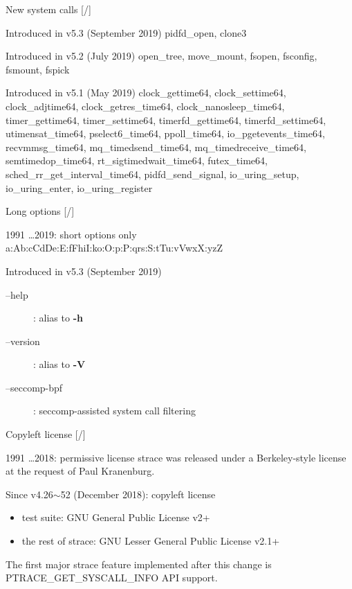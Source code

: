 \documentclass[unicode,aspectratio=169]{beamer}
\begin{document}
\begin{frame}{New system calls \hfill [\insertframenumber/\inserttotalframenumber]}
\begin{block}{\Large Introduced in v5.3 (September 2019)}
pidfd\_open, clone3
\end{block}

\begin{block}{\Large Introduced in v5.2 (July 2019)}
open\_tree, move\_mount, fsopen, fsconfig, fsmount, fspick
\end{block}

\begin{block}{\Large Introduced in v5.1 (May 2019)}
clock\_gettime64,
clock\_settime64,
clock\_adjtime64,
clock\_getres\_time64,
clock\_nanosleep\_time64,
timer\_gettime64,
timer\_settime64,
timerfd\_gettime64,
timerfd\_settime64,
utimensat\_time64,
pselect6\_time64,
ppoll\_time64,
io\_pgetevents\_time64,
recvmmsg\_time64,
mq\_timedsend\_time64,
mq\_timedreceive\_time64,
semtimedop\_time64,
rt\_sigtimedwait\_time64,
futex\_time64,
sched\_rr\_get\_interval\_time64,
pidfd\_send\_signal,
io\_uring\_setup,
io\_uring\_enter,
io\_uring\_register
\end{block}
\end{frame}

\begin{frame}{Long options \hfill [\insertframenumber/\inserttotalframenumber]}
\Large
\begin{block}{1991 \ldots 2019: short options only}
	a:Ab:cCdDe:E:fFhiI:ko:O:p:P:qrs:S:tTu:vVwxX:yzZ
\end{block}
\begin{block}{Introduced in v5.3 (September 2019)}
\begin{description}
	\item[--help]: alias to \textbf{-h}
	\item[--version]: alias to \textbf{-V}
	\item[--seccomp-bpf]: seccomp-assisted system call filtering
\end{description}
\end{block}
\end{frame}

\begin{frame}{Copyleft license \hfill [\insertframenumber/\inserttotalframenumber]}
\Large
\begin{block}{\Large 1991 \ldots 2018: permissive license}
strace was released under a Berkeley-style license \\ at the request of Paul Kranenburg.
\end{block}
\begin{block}{\Large Since v4.26$\sim$52 (December 2018): copyleft license}
\begin{itemize}
	\item test suite: GNU General Public License v2+
	\item the rest of strace: GNU Lesser General Public License v2.1+
\end{itemize}
\end{block}
The first major strace feature implemented after this change is PTRACE\_GET\_SYSCALL\_INFO API support.
\end{frame}
\end{document}
